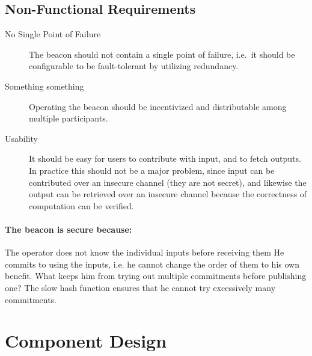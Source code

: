 \subsection{Non-Functional Requirements}
\label{sub:non_functional_requirements}

\begin{description}
    \item[No Single Point of Failure] The beacon should not contain a single point of failure, i.e.\ it should be configurable to be fault-tolerant by utilizing redundancy.
    \item[Something something] Operating the beacon should be incentivized and distributable among multiple participants.   
    \item[Usability] It should be easy for users to contribute with input, and to fetch outputs. In practice this should not be a major problem, since input can be contributed over an insecure channel (they are not secret), and likewise the output can be retrieved over an insecure channel because the correctness of computation can be verified. 
\end{description}


\paragraph{The beacon is secure because:}
The operator does not know the individual inputs before receiving them
He commits to using the inputs, i.e. he cannot change the order of them to his own benefit. What keeps him from trying out multiple commitments before publishing one?
The slow hash function ensures that he cannot try excessively many commitments.

\section{Component Design}

